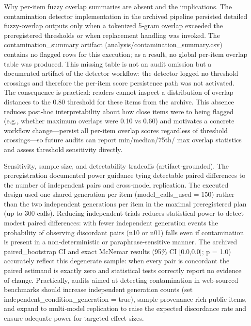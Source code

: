 \documentclass[conference]{IEEEtran}
\begin{document}
Why per‑item fuzzy overlap summaries are absent and the implications. The contamination detector implementation in the archived pipeline persisted detailed fuzzy‑overlap outputs only when a tokenized 5‑gram overlap exceeded the preregistered thresholds or when replacement handling was invoked. The contamination\_summary artifact (analysis/contamination\_summary.csv) contains no flagged rows for this execution; as a result, no global per‑item overlap table was produced. This missing table is not an audit omission but a documented artifact of the detector workflow: the detector logged no threshold crossings and therefore the per‑item score persistence path was not activated. The consequence is practical: readers cannot inspect a distribution of overlap distances to the 0.80 threshold for these items from the archive. This absence reduces post‑hoc interpretability about how close items were to being flagged (e.g., whether maximum overlaps were 0.10 vs 0.60) and motivates a concrete workflow change---persist all per‑item overlap scores regardless of threshold crossings---so future audits can report min/median/75th/ max overlap statistics and assess threshold sensitivity directly.

Sensitivity, sample size, and detectability tradeoffs (artifact‑grounded). The preregistration documented power guidance tying detectable paired differences to the number of independent pairs and cross‑model replication. The executed design used one shared generation per item (model\_calls\_used = 150) rather than the two independent generations per item in the maximal preregistered plan (up to 300 calls). Reducing independent trials reduces statistical power to detect modest paired differences: with fewer independent generation events the probability of observing discordant pairs (n10 or n01) falls even if contamination is present in a non‑deterministic or paraphrase‑sensitive manner. The archived paired\_bootstrap CI and exact McNemar results (95\% CI [0.0,0.0]; p = 1.0) accurately reflect this degenerate sample: when every pair is concordant the paired estimand is exactly zero and statistical tests correctly report no evidence of change. Practically, audits aimed at detecting contamination in web‑sourced benchmarks should increase independent generation counts (set independent\_condition\_generation = true), sample provenance‑rich public items, and expand to multi‑model replication to raise the expected discordance rate and ensure adequate power for targeted effect sizes.
\end{document}
